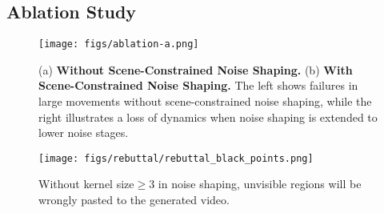 









\subsection{Ablation Study}

\begin{figure}[!ht]
    \centering
    \vspace{-2mm}
    \texttt{[image: figs/ablation-a.png]}
    \caption{
    (a) \textbf{Without Scene-Constrained Noise Shaping.} (b) \textbf{With Scene-Constrained Noise Shaping.} The left shows failures in large movements without scene-constrained noise shaping, while the right illustrates a loss of dynamics when noise shaping is extended to lower noise stages.} 
    \label{fig:ablation_visualization}
\end{figure}

\begin{figure}[!ht]
    \centering
    \vspace{-2mm}
    \texttt{[image: figs/rebuttal/rebuttal\_black\_points.png]}
    \caption{
    Without kernel size$\ge$3 in noise shaping, unvisible regions will be wrongly pasted to the generated video. } 
    \label{fig:rebuttal_kernel_size}
\end{figure}


